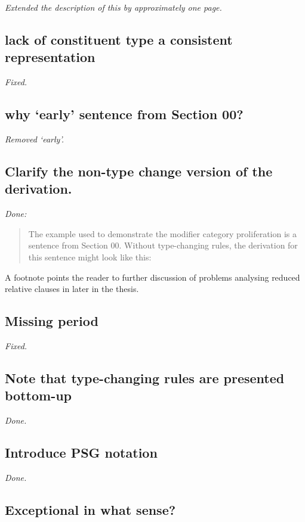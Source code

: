 \emph{Extended the description of this by approximately one page.}

\subsection{lack of constituent type a consistent representation}

\emph{Fixed.}

\subsection{why `early' sentence from Section 00?}

\emph{Removed `early'.}

\subsection{Clarify the non-type change version of the derivation.}

\emph{Done:}

\begin{quote}
 The example \citet{hock:thesis03} used to demonstrate the modifier category
proliferation is a sentence from Section 00. Without type-changing rules,
the \ccg derivation for this sentence might look like this:
\end{quote}

A footnote points the reader to further discussion of problems
analysing reduced relative clauses in \ccg later in the thesis.

\subsection{Missing period}

\emph{Fixed.}

\subsection{Note that type-changing rules are presented bottom-up}

\emph{Done.}

\subsection{Introduce PSG notation}

\emph{Done.}

\subsection{Exceptional in what sense?}

